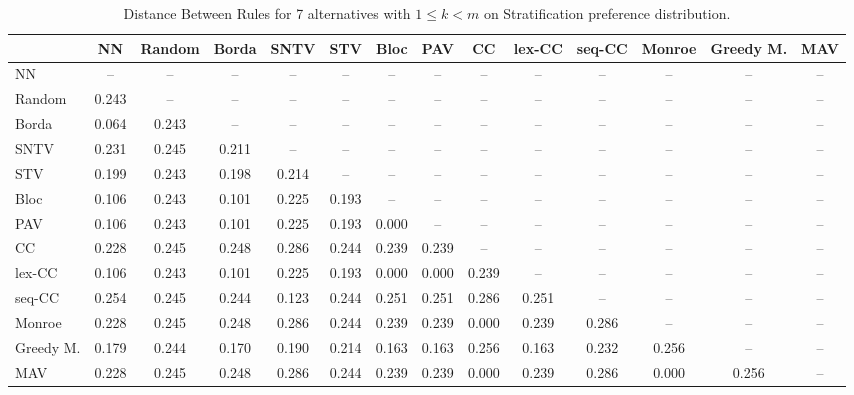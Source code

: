 
\begin{table*}
\centering
\begin{tabular}{lccccccccccccc}
\toprule
 & NN & Random & Borda & SNTV & STV & Bloc & PAV & CC & lex-CC & seq-CC & Monroe & Greedy M. & MAV \\
\midrule
NN & -- & -- & -- & -- & -- & -- & -- & -- & -- & -- & -- & -- & -- \\
Random & 0.243 & -- & -- & -- & -- & -- & -- & -- & -- & -- & -- & -- & -- \\
Borda & 0.064 & 0.243 & -- & -- & -- & -- & -- & -- & -- & -- & -- & -- & -- \\
SNTV & 0.231 & 0.245 & 0.211 & -- & -- & -- & -- & -- & -- & -- & -- & -- & -- \\
STV & 0.199 & 0.243 & 0.198 & 0.214 & -- & -- & -- & -- & -- & -- & -- & -- & -- \\
Bloc & 0.106 & 0.243 & 0.101 & 0.225 & 0.193 & -- & -- & -- & -- & -- & -- & -- & -- \\
PAV & 0.106 & 0.243 & 0.101 & 0.225 & 0.193 & 0.000 & -- & -- & -- & -- & -- & -- & -- \\
CC & 0.228 & 0.245 & 0.248 & 0.286 & 0.244 & 0.239 & 0.239 & -- & -- & -- & -- & -- & -- \\
lex-CC & 0.106 & 0.243 & 0.101 & 0.225 & 0.193 & 0.000 & 0.000 & 0.239 & -- & -- & -- & -- & -- \\
seq-CC & 0.254 & 0.245 & 0.244 & 0.123 & 0.244 & 0.251 & 0.251 & 0.286 & 0.251 & -- & -- & -- & -- \\
Monroe & 0.228 & 0.245 & 0.248 & 0.286 & 0.244 & 0.239 & 0.239 & 0.000 & 0.239 & 0.286 & -- & -- & -- \\
Greedy M. & 0.179 & 0.244 & 0.170 & 0.190 & 0.214 & 0.163 & 0.163 & 0.256 & 0.163 & 0.232 & 0.256 & -- & -- \\
MAV & 0.228 & 0.245 & 0.248 & 0.286 & 0.244 & 0.239 & 0.239 & 0.000 & 0.239 & 0.286 & 0.000 & 0.256 & -- \\
\bottomrule
\end{tabular}

\caption{Distance Between Rules for 7 alternatives with $1 \leq k < m$ on Stratification preference distribution.}
\end{table*}
